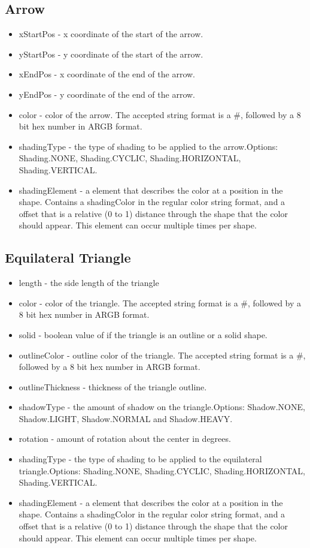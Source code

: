 \documentclass{article}
\begin{document}
\subsection{Arrow}
\begin{itemize}
\item xStartPos - x coordinate of the start of the arrow.
\item yStartPos - y coordinate of the start of the arrow.
\item xEndPos - x coordinate of the end of the arrow.
\item yEndPos - y coordinate of the end of the arrow.
\item color - color of the arrow. The accepted string format is a \#, followed by a 8 bit hex number in ARGB format.
\item shadingType - the type of shading to be applied to the arrow.\newline  Options: Shading.NONE, Shading.CYCLIC, Shading.HORIZONTAL, Shading.VERTICAL.
\item shadingElement - a element that describes the color at a position in the shape. Contains a shadingColor in the regular color string format, and a offset that is a relative (0 to 1) distance through the shape that the color should appear. This element can occur multiple times per shape.
\end{itemize}


\subsection{Equilateral Triangle}
\begin{itemize}
\item length - the side length of the triangle
\item color - color of the triangle. The accepted string format is a \#, followed by a 8 bit hex number in ARGB format.
\item solid - boolean value of if the triangle is an outline or a solid shape.
\item outlineColor - outline color of the triangle. The accepted string format is a \#, followed by a 8 bit hex number in ARGB format.
\item outlineThickness - thickness of the triangle outline.
\item shadowType - the amount of shadow on the triangle.\newline  Options: Shadow.NONE, Shadow.LIGHT, Shadow.NORMAL and Shadow.HEAVY.
\item rotation - amount of rotation about the center in degrees. 
\item shadingType - the type of shading to be applied to the equilateral triangle.\newline  Options: Shading.NONE, Shading.CYCLIC, Shading.HORIZONTAL, Shading.VERTICAL.
\item shadingElement - a element that describes the color at a position in the shape. Contains a shadingColor in the regular color string format, and a offset that is a relative (0 to 1) distance through the shape that the color should appear. This element can occur multiple times per shape.
\end{itemize}
\end{document}
